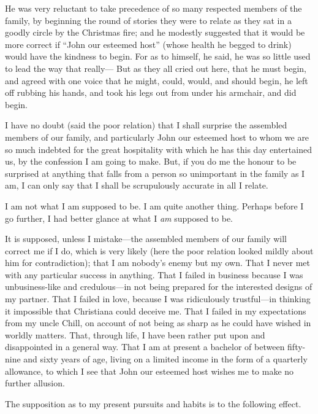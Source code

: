 He was very reluctant to take precedence of so many respected
members of the family, by beginning the round of stories they were
to relate as they sat in a goodly circle by the Christmas fire; and
he modestly suggested that it would be more correct if ``John our
esteemed host'' (whose health he begged to drink) would have the
kindness to begin.  For as to himself, he said, he was so little
used to lead the way that really--- But as they all cried out here,
that he must begin, and agreed with one voice that he might, could,
would, and should begin, he left off rubbing his hands, and took his
legs out from under his armchair, and did begin.

I have no doubt (said the poor relation) that I shall surprise the
assembled members of our family, and particularly John our esteemed
host to whom we are so much indebted for the great hospitality with
which he has this day entertained us, by the confession I am going
to make.  But, if you do me the honour to be surprised at anything
that falls from a person so unimportant in the family as I am, I can
only say that I shall be scrupulously accurate in all I relate.

I am not what I am supposed to be.  I am quite another thing.
Perhaps before I go further, I had better glance at what I \emph{am}
supposed to be.

It is supposed, unless I mistake---the assembled members of our
family will correct me if I do, which is very likely (here the poor
relation looked mildly about him for contradiction); that I am
nobody's enemy but my own.  That I never met with any particular
success in anything.  That I failed in business because I was
unbusiness-like and credulous---in not being prepared for the
interested designs of my partner.  That I failed in love, because I
was ridiculously trustful---in thinking it impossible that Christiana
could deceive me.  That I failed in my expectations from my uncle
Chill, on account of not being as sharp as he could have wished in
worldly matters.  That, through life, I have been rather put upon
and disappointed in a general way.  That I am at present a bachelor
of between fifty-nine and sixty years of age, living on a limited
income in the form of a quarterly allowance, to which I see that
John our esteemed host wishes me to make no further allusion.

The supposition as to my present pursuits and habits is to the
following effect.


